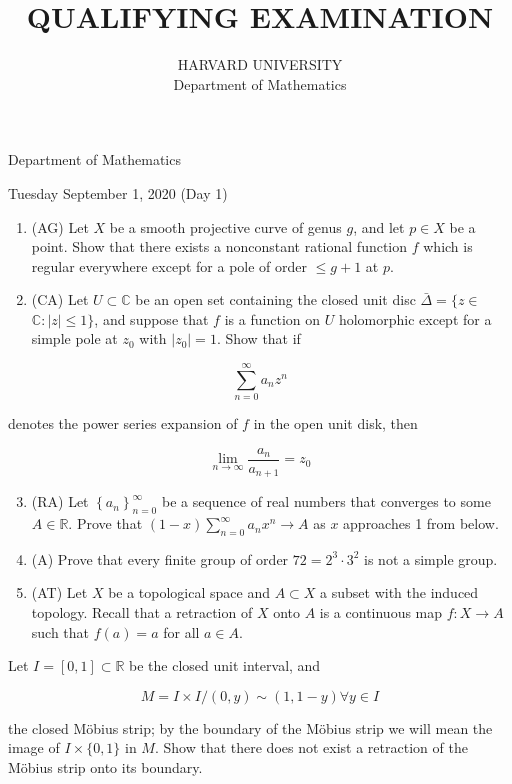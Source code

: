 \documentclass[10pt]{article}
\title{QUALIFYING EXAMINATION }
\author{HARVARD UNIVERSITY\\
Department of Mathematics}
\date{}
\begin{document}
\maketitle
Department of Mathematics

Tuesday September 1, 2020 (Day 1)

\begin{enumerate}
  \item (AG) Let $X$ be a smooth projective curve of genus $g$, and let $p \in X$ be a point. Show that there exists a nonconstant rational function $f$ which is regular everywhere except for a pole of order $\leq g+1$ at $p$.

  \item (CA) Let $U \subset \mathbb{C}$ be an open set containing the closed unit disc $\bar{\Delta}=\{z \in$ $\mathbb{C}:|z| \leq 1\}$, and suppose that $f$ is a function on $U$ holomorphic except for a simple pole at $z_{0}$ with $\left|z_{0}\right|=1$. Show that if

\end{enumerate}

$$
\sum_{n=0}^{\infty} a_{n} z^{n}
$$

denotes the power series expansion of $f$ in the open unit disk, then

$$
\lim _{n \rightarrow \infty} \frac{a_{n}}{a_{n+1}}=z_{0}
$$

\begin{enumerate}
  \setcounter{enumi}{2}
  \item (RA) Let $\left\{a_{n}\right\}_{n=0}^{\infty}$ be a sequence of real numbers that converges to some $A \in \mathbb{R}$. Prove that $(1-x) \sum_{n=0}^{\infty} a_{n} x^{n} \rightarrow A$ as $x$ approaches 1 from below.

  \item (A) Prove that every finite group of order $72=2^{3} \cdot 3^{2}$ is not a simple group.

  \item (AT) Let $X$ be a topological space and $A \subset X$ a subset with the induced topology. Recall that a retraction of $X$ onto $A$ is a continuous map $f: X \rightarrow A$ such that $f(a)=a$ for all $a \in A$.

\end{enumerate}

Let $I=[0,1] \subset \mathbb{R}$ be the closed unit interval, and

$$
M=I \times I /(0, y) \sim(1,1-y) \forall y \in I
$$

the closed Möbius strip; by the boundary of the Möbius strip we will mean the image of $I \times\{0,1\}$ in $M$. Show that there does not exist a retraction of the Möbius strip onto its boundary.
\end{document}
